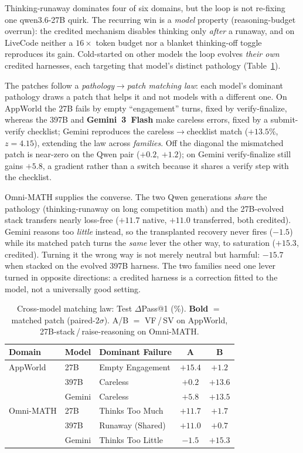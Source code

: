 Thinking-runaway dominates four of six domains, but the loop is not re-fixing one
qwen3.6-27B quirk. The recurring win is a \emph{model} property (reasoning-budget overrun):
the credited mechanism disables thinking only \emph{after} a runaway, and on LiveCode neither
a $16\times$ token budget nor a blanket thinking-off toggle reproduces its gain. Cold-started
on other models the loop evolves \emph{their own} credited harnesses, each targeting that
model's distinct pathology (Table~\ref{tab:crossmodel}).

The patches follow a \emph{pathology$\to$patch matching law}: each model's dominant pathology
draws a patch that helps it and not models with a different one. On AppWorld the 27B fails by
empty ``engagement'' turns, fixed by verify-finalize, whereas the 397B and
\textbf{Gemini~3~Flash} make careless errors, fixed by a submit-verify checklist; Gemini
reproduces the careless$\to$checklist match ($+13.5$\%, $z{=}4.15$), extending the law
across \emph{families}. Off the diagonal the mismatched patch is near-zero on the Qwen pair
($+0.2$, $+1.2$); on Gemini verify-finalize still gains $+5.8$, a gradient rather than a
switch because it shares a verify step with the checklist.

Omni-MATH supplies the converse. The two Qwen generations \emph{share} the pathology
(thinking-runaway on long competition math) and the 27B-evolved stack transfers nearly
loss-free ($+11.7$ native, $+11.0$ transferred, both credited). Gemini reasons too
\emph{little} instead, so the transplanted recovery never fires ($-1.5$) while its matched
patch turns the \emph{same} lever the other way, to saturation ($+15.3$, credited). Turning
it the wrong way is not merely neutral but harmful: $-15.7$ when stacked on the evolved 397B
harness. The two families need one lever turned in opposite directions: a credited harness is
a correction fitted to the model, not a universally good setting.

\begin{table}[t]
\centering
\footnotesize
\setlength{\tabcolsep}{3.5pt}
\caption{Cross-model matching law: Test $\Delta$Pass@1 (\%). \textbf{Bold} $=$ matched
patch (paired-$2\sigma$). A/B $=$ VF\,/\,SV on AppWorld, 27B-stack\,/\,raise-reasoning on
Omni-MATH.}
\label{tab:crossmodel}
\begin{tabular}{lllcc}
\toprule
Domain & Model & Dominant Failure & A & B \\
\midrule
AppWorld  & 27B    & Empty Engagement  & $\mathbf{+15.4}$ & $+1.2$ \\
          & 397B   & Careless          & $+0.2$           & $\mathbf{+13.6}$ \\
          & Gemini & Careless          & $+5.8$           & $\mathbf{+13.5}$ \\
\midrule
Omni-MATH & 27B    & Thinks Too Much   & $\mathbf{+11.7}$ & $+1.7$ \\
          & 397B   & Runaway (Shared)  & $\mathbf{+11.0}$ & $+0.7$ \\
          & Gemini & Thinks Too Little & $-1.5$           & $\mathbf{+15.3}$ \\
\bottomrule
\end{tabular}

\end{table}


